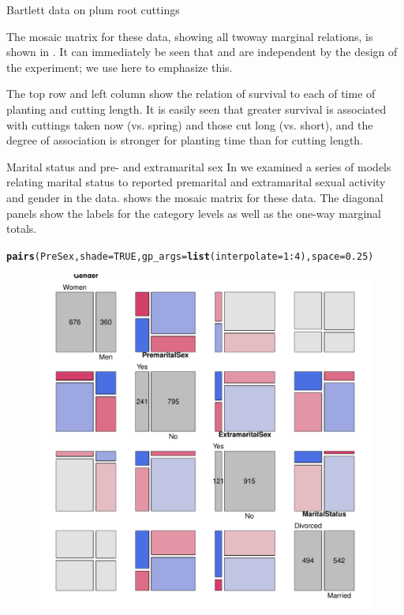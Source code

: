 \documentclass[11pt]{book}\usepackage[]{graphicx}\usepackage[]{color}
\makeatletter
\newcommand{\hlnum}[1]{\textcolor[rgb]{0.686,0.059,0.569}{#1}}%
\newcommand{\hlopt}[1]{\textcolor[rgb]{0,0,0}{#1}}%
\newcommand{\hlstd}[1]{\textcolor[rgb]{0.345,0.345,0.345}{#1}}%
\newcommand{\hlkwc}[1]{\textcolor[rgb]{0.333,0.667,0.333}{#1}}%
\newcommand{\hlkwd}[1]{\textcolor[rgb]{0.737,0.353,0.396}{\textbf{#1}}}%
\newenvironment{kframe}{%
 \def\at@end@of@kframe{}%
 \ifinner\ifhmode%
  \def\at@end@of@kframe{\end{minipage}}%
  \begin{minipage}{\columnwidth}%
 \fi\fi%
 \def\FrameCommand##1{\hskip\@totalleftmargin \hskip-\fboxsep
 \colorbox{shadecolor}{##1}\hskip-\fboxsep
     \hskip-\linewidth \hskip-\@totalleftmargin \hskip\columnwidth}%
 \MakeFramed {\advance\hsize-\width
   \@totalleftmargin\z@ \linewidth\hsize
   \@setminipage}}%
 {\par\unskip\endMakeFramed%
 \at@end@of@kframe}
\newenvironment{knitrout}{}{} %
\renewenvironment{knitrout}{\small\renewcommand{\baselinestretch}{.85}}{} %
\makeatother
\begin{document}
\begin{Example}[bartlett]{Bartlett data on plum root cuttings}
\begin{knitrout}
\end{knitrout}

The mosaic matrix for these data, showing all twoway marginal relations, is shown
in . 
It can immediately be seen that  and  are independent
by the design of the experiment; we use  here to emphasize
this.

The top row and left column show the relation of survival to each of time of planting
and cutting length.  It is easily seen that greater survival is associated with
cuttings taken now (vs. spring) and those cut long (vs. short),
and the degree of association is stronger for planting time than for cutting length.
\end{Example}

\begin{Example}[marital2]{Marital status and pre- and extramarital sex}
In  we examined a series of models relating marital
status to reported premarital and extramarital sexual activity and gender in the
 data.
 shows the mosaic matrix for these data.
The diagonal panels show the labels for the category levels as well as
the one-way marginal totals.

\begin{knitrout}
\color{fgcolor}\begin{kframe}
\begin{alltt}
\hlkwd{pairs}\hlstd{(PreSex,} \hlkwc{shade}\hlstd{=}\hlnum{TRUE}\hlstd{,} \hlkwc{gp_args}\hlstd{=}\hlkwd{list}\hlstd{(}\hlkwc{interpolate}\hlstd{=}\hlnum{1}\hlopt{:}\hlnum{4}\hlstd{),} \hlkwc{space}\hlstd{=}\hlnum{0.25}\hlstd{)}
\end{alltt}
\end{kframe}\begin{figure}[!htb]


\centerline{\includegraphics[width=.8\textwidth]{ch05/fig/marital-pairs} }


\end{figure}
\end{knitrout}
\end{Example}
\end{document}
